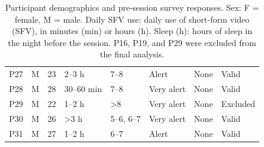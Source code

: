 \begin{table}[H]
{\begin{tabular}{llclllcl}
P27 & M & 23 & 2–3 h & 7–8 & Alert & None & Valid \\
P28 & M & 28 & 30–60 min & 7–8 & Very alert & None & Valid \\
P29 & M & 22 & 1–2 h & >8 & Very alert & None & Excluded \\
P30 & M & 26 & >3 h & 5–6, 6–7 & Very alert & None & Valid \\
P31 & M & 27 & 1–2 h & 6–7 & Alert & None & Valid \\
\bottomrule
\end{tabular}
}
\caption{Participant demographics and pre-session survey responses. Sex: F = female, M = male. Daily SFV use: daily use of short-form video (SFV), in minutes (min) or hours (h). Sleep (h): hours of sleep in the night before the session. P16, P19, and P29 were excluded from the final analysis.}
\label{tab:participant_demographics}
\end{table}
